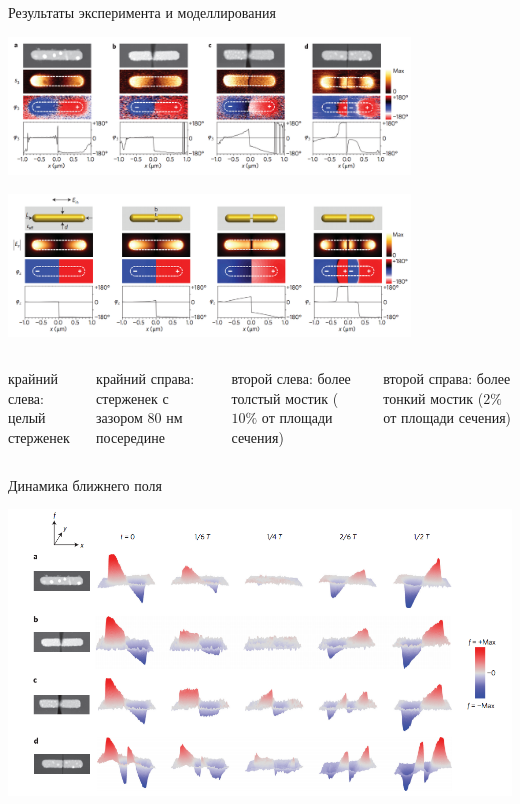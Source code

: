 \documentclass[9pt, compress, xcolor=table]{beamer}
\begin{document}
\begin{frame}{Результаты эксперимента и моделлирования}
\begin{center}
\includegraphics[width=0.8\textwidth]{optant73}

\includegraphics[width=0.8\textwidth]{optant74}
\end{center}
\begin{columns}
\column{6cm}
\textcolor{red!50!black}{крайний слева}: целый стерженек

\textcolor{red!50!black}{крайний справа}: стерженек с зазором 80 нм посередине

\column{6cm}

\textcolor{red!50!black}{второй слева}: более толстый мостик ($10 \%$ от площади сечения)

\textcolor{red!50!black}{второй справа}: более тонкий мостик ($2 \%$ от площади сечения)
\end{columns}


\end{frame}
\begin{frame}{Динамика ближнего поля}

\begin{center}

\includegraphics[width=\textwidth]{optant75}
\end{center}

\end{frame}
\end{document}
